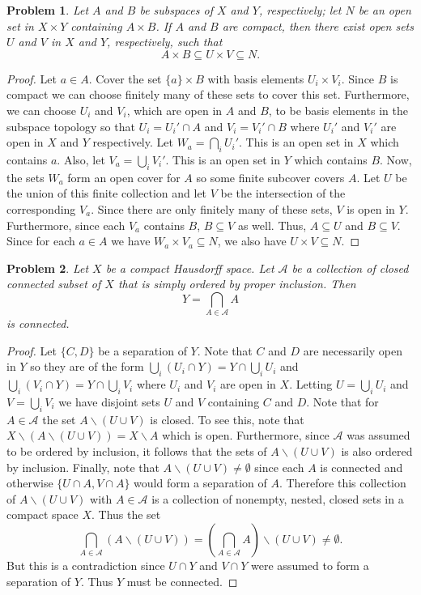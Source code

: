 \documentclass{article}
\newtheorem{problem}{Problem}
\begin{document}
\begin{problem}
Let $A$ and $B$ be subspaces of $X$ and $Y$, respectively; let $N$ be an open set in $X \times Y$ containing $A \times B$. If $A$ and $B$ are compact, then there exist open sets $U$ and $V$ in $X$ and $Y$, respectively, such that
\[
A \times B \subseteq U \times V \subseteq N.
\]
\end{problem}
\begin{proof}
Let $a \in A$. Cover the set $\{a\} \times B$ with basis elements $U_i \times V_i$. Since $B$ is compact we can choose finitely many of these sets to cover this set. Furthermore, we can choose $U_i$ and $V_i$, which are open in $A$ and $B$, to be basis elements in the subspace topology so that $U_i = U_i' \cap A$ and $V_i = V_i' \cap B$ where $U_i'$ and $V_i'$ are open in $X$ and $Y$ respectively. Let $W_a = \bigcap_i U_i'$. This is an open set in $X$ which contains $a$. Also, let $V_a = \bigcup_i V_i'$. This is an open set in $Y$ which contains $B$. Now, the sets $W_a$ form an open cover for $A$ so some finite subcover covers $A$. Let $U$ be the union of this finite collection and let $V$ be the intersection of the corresponding $V_a$. Since there are only finitely many of these sets, $V$ is open in $Y$. Furthermore, since each $V_a$ contains $B$, $B \subseteq V$ as well. Thus, $A \subseteq U$ and $B \subseteq V$. Since for each $a \in A$ we have $W_a \times V_a \subseteq N$, we also have $U \times V \subseteq N$.
\end{proof}

\begin{problem}
Let $X$ be a compact Hausdorff space. Let $\mathcal{A}$ be a collection of closed connected subset of $X$ that is simply ordered by proper inclusion. Then
\[
Y = \bigcap_{A \in \mathcal{A}} A
\]
is connected.
\end{problem}
\begin{proof}
Let $\{C, D\}$ be a separation of $Y$. Note that $C$ and $D$ are necessarily open in $Y$ so they are of the form $\bigcup_i (U_i \cap Y) = Y \cap \bigcup_i U_i$ and $\bigcup_i (V_i \cap Y) = Y \cap \bigcup_i V_i$ where $U_i$ and $V_i$ are open in $X$. Letting $U = \bigcup_i U_i$ and $V = \bigcup_i V_i$ we have disjoint sets $U$ and $V$ containing $C$ and $D$. Note that for $A \in \mathcal{A}$ the set $A \backslash (U \cup V)$ is closed. To see this, note that $X \backslash (A \backslash (U \cup V)) = X \backslash A$ which is open. Furthermore, since $\mathcal{A}$ was assumed to be ordered by inclusion, it follows that the sets of $A \backslash (U \cup V)$ is also ordered by inclusion. Finally, note that $A \backslash (U \cup V) \neq \emptyset$ since each $A$ is connected and otherwise $\{U \cap A, V \cap A\}$ would form a separation of $A$. Therefore this collection of $A \backslash (U \cup V)$ with $A \in \mathcal{A}$ is a collection of nonempty, nested, closed sets in a compact space $X$. Thus the set
\[
\bigcap_{A \in \mathcal{A}} (A \backslash (U \cup V)) = \left ( \bigcap_{A \in \mathcal{A}} A \right ) \backslash (U \cup V) \neq \emptyset.
\]
But this is a contradiction since $U \cap Y$ and $V \cap Y$ were assumed to form a separation of $Y$. Thus $Y$ must be connected.
\end{proof}
\end{document}
